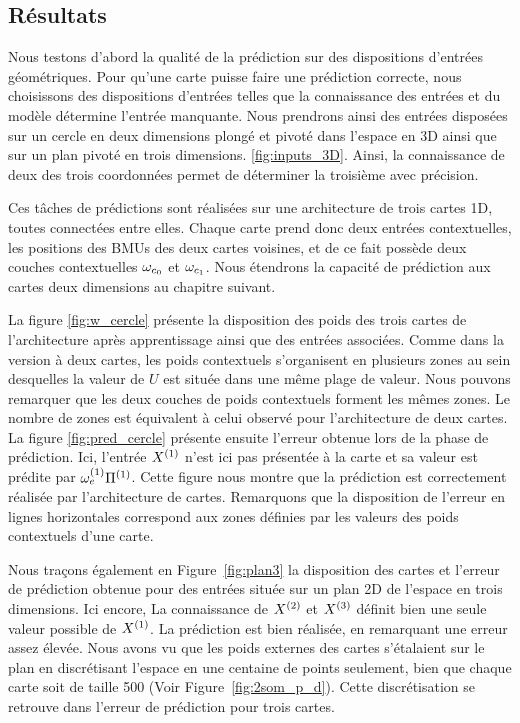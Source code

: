 \documentclass[../main]{subfiles}
\begin{document}
\subsection{Résultats}

Nous testons d'abord la qualité de la prédiction sur des dispositions d'entrées géométriques.
Pour qu'une carte puisse faire une prédiction correcte, nous choisissons des dispositions d'entrées telles que la connaissance des entrées et du modèle détermine l'entrée manquante.
Nous prendrons ainsi des entrées disposées sur un cercle en deux dimensions plongé et pivoté dans l'espace en 3D ainsi que sur un plan pivoté en trois dimensions. \ref{fig:inputs_3D}. Ainsi, la connaissance de deux des trois coordonnées permet de déterminer la troisième avec précision.

Ces tâches de prédictions sont réalisées sur une architecture de trois cartes 1D, toutes connectées entre elles. 
Chaque carte prend donc deux entrées contextuelles, les positions des BMUs des deux cartes voisines, et de ce fait possède deux couches contextuelles $\omega_{c_0}$ et $\omega_{c_1}$.
Nous étendrons la capacité de prédiction aux cartes deux dimensions au chapitre suivant.


La figure \ref{fig:w_cercle} présente la disposition des poids des trois cartes de l'architecture après apprentissage ainsi que des entrées associées. 
Comme dans la version à deux cartes, les poids contextuels s'organisent en plusieurs zones au sein desquelles la valeur de $U$ est située dans une même plage de valeur.
Nous pouvons remarquer que les deux couches de poids contextuels forment les mêmes zones. Le nombre de zones est équivalent à celui observé pour l'architecture de deux cartes.
La figure \ref{fig:pred_cercle} présente ensuite l'erreur obtenue lors de la phase de prédiction. 
Ici, l'entrée $X^{({1})}$ n'est ici pas présentée à la carte et sa valeur est prédite par $\omega_{e}^{({1})}{\Pi^{({1})}}$. 
Cette figure nous montre que la prédiction est correctement réalisée par l'architecture de cartes. Remarquons que la disposition de l'erreur en lignes horizontales correspond aux zones définies par les valeurs des poids contextuels d'une carte.

Nous traçons également en Figure~\ref{fig:plan3} la disposition des cartes et l'erreur de prédiction obtenue pour des entrées située sur un plan 2D de l'espace en trois dimensions. Ici encore, La connaissance de $X^{({2})}$ et $X^{({3})}$ définit bien une seule valeur possible de $X^{({1})}$. La prédiction est bien réalisée, en remarquant une erreur assez élevée. 
Nous avons vu que les poids externes des cartes s'étalaient sur le plan en discrétisant l'espace en une centaine de points seulement, bien que chaque carte soit de taille 500 (Voir Figure~\ref{fig:2som_p_d}). 
Cette discrétisation se retrouve dans l'erreur de prédiction pour trois cartes.
\end{document}
